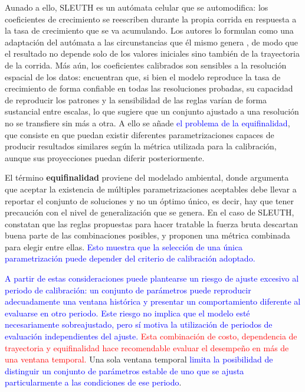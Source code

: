 Aunado a ello, SLEUTH es un autómata celular que se automodifica: los
coeficientes de crecimiento se reescriben durante la propia corrida en
respuesta a la tasa de crecimiento que se va acumulando. Los autores lo
formulan como una adaptación del autómata a las circunstancias que él mismo
genera \parencite{ClarkeHoppen1997}, de modo que el resultado no depende solo
de los valores iniciales sino también de la trayectoria de la corrida. Más
aún, los coeficientes calibrados son sensibles a la resolución espacial de los
datos: \textcite{JantzGoetz2005} encuentran que, si bien el modelo reproduce
la tasa de crecimiento de forma confiable en todas las resoluciones probadas,
su capacidad de reproducir los patrones y la sensibilidad de las reglas varían
de forma sustancial entre escalas, lo que sugiere que un conjunto ajustado a
una resolución no se transfiere sin más a otra. A ello se añade
\textcolor{blue}{el problema de la equifinalidad}, que consiste en que puedan
existir diferentes parametrizaciones capaces de producir resultados similares
según la métrica utilizada para la calibración, aunque sus proyecciones puedan
diferir posteriormente.

El término \textbf{equifinalidad} proviene del modelado ambiental, donde
\textcite{Beven2006} argumenta que aceptar la existencia de múltiples
parametrizaciones aceptables debe llevar a reportar el conjunto de soluciones
y no un óptimo único, es decir, hay que tener precaución con el nivel de
generalización que se genera. En el caso de SLEUTH, \textcite{Dietzel2007}
constatan que las reglas propuestas para hacer tratable la fuerza bruta
descartan buena parte de las combinaciones posibles, y proponen una métrica
combinada para elegir entre ellas. \textcolor{blue}{Esto muestra que la
selección de una única parametrización puede depender del criterio de
calibración adoptado.}

\textcolor{blue}{A partir de estas consideraciones puede plantearse un riesgo
de ajuste excesivo al periodo de calibración: un conjunto de parámetros puede
reproducir adecuadamente una ventana histórica y presentar un comportamiento
diferente al evaluarse en otro periodo. Este riesgo no implica que el modelo
esté necesariamente sobreajustado, pero sí motiva la utilización de periodos
de evaluación independientes del ajuste.} \textcolor{red}{Esta combinación de
costo, dependencia de trayectoria y equifinalidad hace recomendable evaluar el
desempeño en más de una ventana temporal.} Una sola
ventana temporal \textcolor{blue}{limita la posibilidad de distinguir un
conjunto de parámetros estable de uno que se ajusta particularmente a las
condiciones de ese periodo}.

